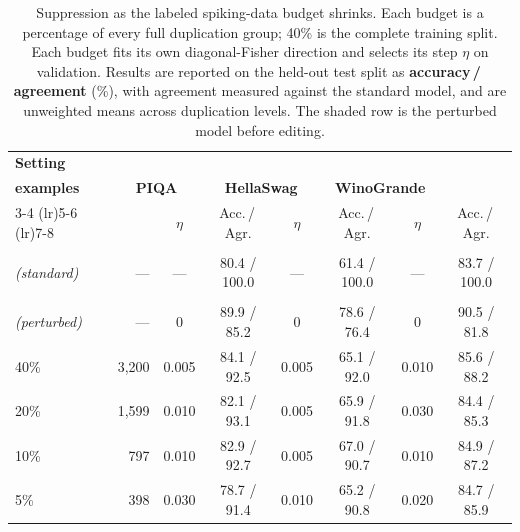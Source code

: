 \begin{table}[h]
    \centering
    \small
    \setlength{\tabcolsep}{4pt}
    \renewcommand{\arraystretch}{1.12}
    \caption{
        Suppression as the labeled spiking-data budget shrinks. Each budget is a
        percentage of every full duplication group; 40\% is the complete training
        split. Each budget fits its own diagonal-Fisher direction and selects its
        step $\eta$ on validation. Results are reported on the held-out test split as
        \textbf{accuracy\,/\,agreement} (\%), with agreement measured against the
        standard model, and are unweighted means across duplication levels. The
        shaded row is the perturbed model before editing.
    }
    \begin{tabular}{@{}l r cc cc cc@{}}
        \toprule
        \textbf{Setting}
        & \shortstack{\textbf{Fitting}\\\textbf{examples}}
        & \multicolumn{2}{c}{\textbf{PIQA}}
        & \multicolumn{2}{c}{\textbf{HellaSwag}}
        & \multicolumn{2}{c}{\textbf{WinoGrande}} \\
        \cmidrule(lr){3-4}
        \cmidrule(lr){5-6}
        \cmidrule(lr){7-8}
        &
        & $\eta$ & Acc.\,/\,Agr.
        & $\eta$ & Acc.\,/\,Agr.
        & $\eta$ & Acc.\,/\,Agr. \\
        \midrule

        \shortstack[l]{\textbf{Target}\\\textit{(standard)}}
        & ---
        & --- & 80.4 / 100.0
        & --- & 61.4 / 100.0
        & --- & 83.7 / 100.0 \\

        \rowcolor{gray!18}
        \shortstack[l]{\textbf{No edit}\\\textit{(perturbed)}}
        & ---
        & 0 & 89.9 / 85.2
        & 0 & 78.6 / 76.4
        & 0 & 90.5 / 81.8 \\

        \midrule

        40\%
        & 3,200
        & 0.005 & 84.1 / 92.5
        & 0.005 & 65.1 / 92.0
        & 0.010 & 85.6 / 88.2 \\

        20\%
        & 1,599
        & 0.010 & 82.1 / 93.1
        & 0.005 & 65.9 / 91.8
        & 0.030 & 84.4 / 85.3 \\

        10\%
        & 797
        & 0.010 & 82.9 / 92.7
        & 0.005 & 67.0 / 90.7
        & 0.010 & 84.9 / 87.2 \\

        5\%
        & 398
        & 0.030 & 78.7 / 91.4
        & 0.010 & 65.2 / 90.8
        & 0.020 & 84.7 / 85.9 \\

        \bottomrule
    \end{tabular}
    \label{tab:spiking-data-budget}
\end{table}
